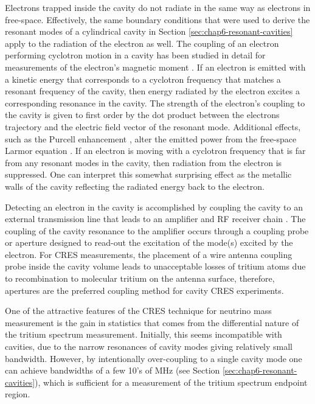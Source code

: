 Electrons trapped inside the cavity do not radiate in the same way as electrons in free-space. Effectively, the same boundary conditions that were used to derive the resonant modes of a cylindrical cavity in Section \ref{sec:chap6-resonant-cavities} apply to the radiation of the electron as well. The coupling of an electron performing cyclotron motion in a cavity has been studied in detail for measurements of the electron's magnetic moment \cite{cyclotron_motion_cavity, hanneke_paper, hanneke_thesis}. If an electron is emitted with a kinetic energy that corresponds to a cyclotron frequency that matches a resonant frequency of the cavity, then energy radiated by the electron excites a corresponding resonance in the cavity. The strength of the electron's coupling to the cavity is given to first order by the dot product between the electrons trajectory and the electric field vector of the resonant mode. Additional effects, such as the Purcell enhancement \cite{purcell}, alter the emitted power from the free-space Larmor equation \cite{larmor_eqn}. If an electron is moving with a cyclotron frequency that is far from any resonant modes in the cavity, then radiation from the electron is suppressed. One can interpret this somewhat surprising effect as the metallic walls of the cavity reflecting the radiated energy back to the electron. 

Detecting an electron in the cavity is accomplished by coupling the cavity to an external transmission line that leads to an amplifier and RF receiver chain \cite{cavity_coupled_to_amp}. The coupling of the cavity resonance to the amplifier occurs through a coupling probe or aperture designed to read-out the excitation of the mode(s) excited by the electron. For CRES measurements, the placement of a wire antenna coupling probe inside the cavity volume leads to unacceptable losses of tritium atoms due to recombination to molecular tritium on the antenna surface, therefore, apertures are the preferred coupling method for cavity CRES experiments.

One of the attractive features of the CRES technique for neutrino mass measurement is the gain in statistics that comes from the differential nature of the tritium spectrum measurement. Initially, this seems incompatible with cavities, due to the narrow resonances of cavity modes giving relatively small bandwidth. However, by intentionally over-coupling to a single cavity mode one can achieve bandwidths of a few 10's of MHz (see Section \ref{sec:chap6-resonant-cavities}), which is sufficient for a measurement of the tritium spectrum endpoint region.  

